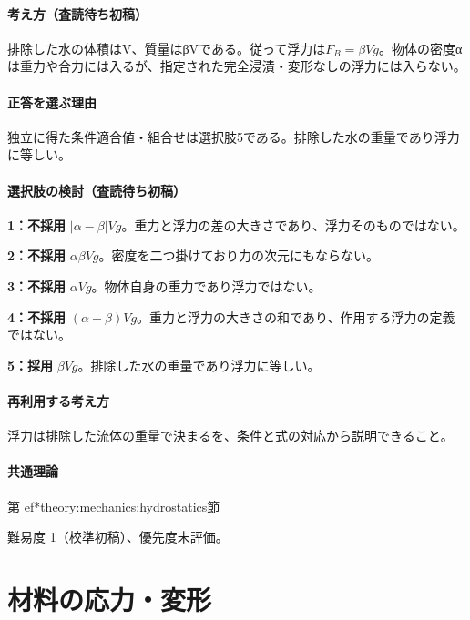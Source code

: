 \paragraph{考え方（査読待ち初稿）} 排除した水の体積はV、質量はβVである。従って浮力は\(F_B=\beta Vg\)。物体の密度αは重力や合力には入るが、指定された完全浸漬・変形なしの浮力には入らない。

\paragraph{正答を選ぶ理由} 独立に得た条件適合値・組合せは選択肢5である。排除した水の重量であり浮力に等しい。

\paragraph{選択肢の検討（査読待ち初稿）}

\noindent\textbf{1：不採用} \(|\alpha-\beta|Vg\)。重力と浮力の差の大きさであり、浮力そのものではない。\par

\noindent\textbf{2：不採用} \(\alpha\beta Vg\)。密度を二つ掛けており力の次元にもならない。\par

\noindent\textbf{3：不採用} \(\alpha Vg\)。物体自身の重力であり浮力ではない。\par

\noindent\textbf{4：不採用} \((\alpha+\beta)Vg\)。重力と浮力の大きさの和であり、作用する浮力の定義ではない。\par

\noindent\textbf{5：採用} \(\beta Vg\)。排除した水の重量であり浮力に等しい。\par

\paragraph{再利用する考え方} 浮力は排除した流体の重量で決まるを、条件と式の対応から説明できること。

\paragraph{共通理論} \hyperref[theory:mechanics:hydrostatics]{第
ef*{theory:mechanics:hydrostatics}節}

\par 難易度 1（校準初稿）、優先度未評価。

\section{材料の応力・変形}

